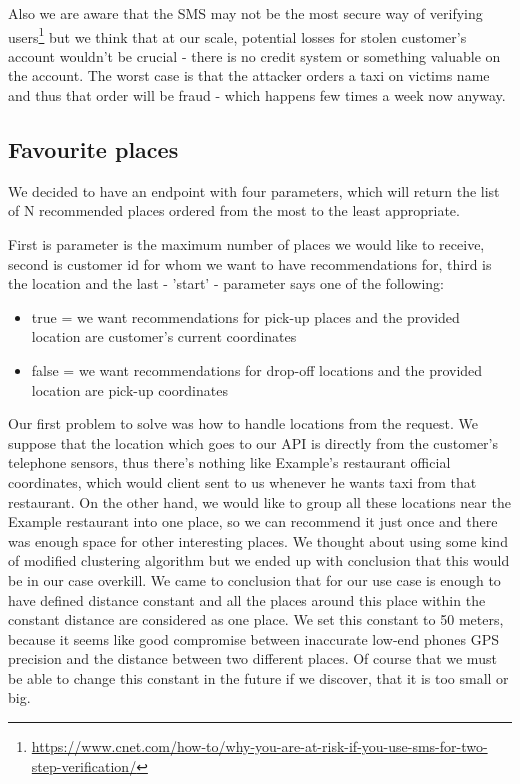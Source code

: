  Also we are aware that the SMS may not be the most secure way of verifying users\footnote{\url{https://www.cnet.com/how-to/why-you-are-at-risk-if-you-use-sms-for-two-step-verification/}} but we think that at our scale, potential losses for stolen customer's account wouldn't be crucial - there is no credit system or something valuable on the account. The worst case is that the attacker orders a taxi on victims name and thus that order will be fraud - which happens few times a week now anyway.
 
 \subsection{Favourite places}
 We decided to have an endpoint with four parameters, which will return the list of N recommended places ordered from the most to the least appropriate.
 
 First is parameter is the maximum number of places we would like to receive, second is customer id for whom we want to have recommendations for, third is the location and the last - 'start' - parameter  says one of the following:
 \begin{itemize}
 	\item true = we want recommendations for pick-up places and the provided location are customer's current coordinates
 	\item false = we want recommendations for drop-off locations and the provided location are pick-up coordinates
 \end{itemize}
 
 Our first problem to solve was how to handle locations from the request. We suppose that the location which goes to our API is directly from the customer's telephone sensors, thus there's nothing like Example's restaurant official coordinates, which would client sent to us whenever he wants taxi from that restaurant. On the other hand, we would like to group all these locations near the Example restaurant into one place, so we can recommend it just once and there was enough space for other interesting places. We thought about using some kind of modified clustering algorithm but we ended up with conclusion that this would be in our case overkill. We came to conclusion that for our use case is enough to have defined distance constant and all the places around this place within the constant distance are considered as one place. We set this constant to 50 meters, because it seems like good compromise between inaccurate low-end phones GPS precision and the distance between two different places. Of course that we must be able to change this constant in the future if we discover, that it is too small or big.
 
